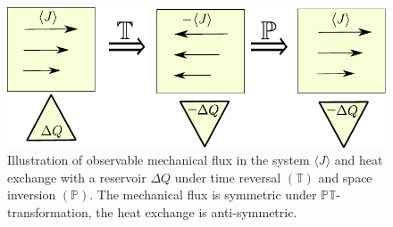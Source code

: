 \begin{figure}
 \centering

 \includegraphics{../images/PT-Transform.pdf}
 \caption[Illustration of symmetric and asymmetric observables under time reversal and space inversion. ]{Illustration of observable mechanical flux in the system $\langle J \rangle$ and heat exchange with a reservoir $\Delta Q$ under 
     time reversal $(\mathbb{T})$ and space inversion $(\mathbb{P})$. The mechanical flux 
     is symmetric under $\mathbb{P}\mathbb{T}$-transformation, the heat exchange is anti-symmetric. }
 \label{fig:PTtransform}
\end{figure}

